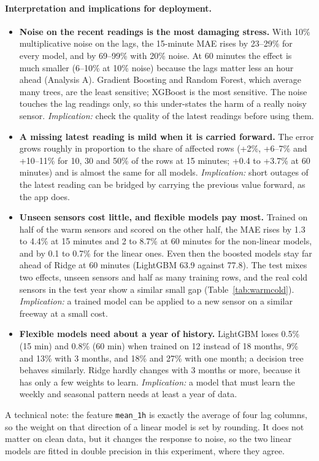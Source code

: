 \documentclass[11pt,a4paper]{article}
\newcommand{\code}[1]{\texttt{#1}}
\begin{document}
\paragraph{Interpretation and implications for deployment.}
\begin{itemize}
\item \textbf{Noise on the recent readings is the most damaging stress.} With 10\% multiplicative noise on the lags, the 15-minute MAE rises by 23--29\% for every model, and by 69--99\% with 20\% noise. At 60 minutes the effect is much smaller (6--10\% at 10\% noise) because the lags matter less
an hour ahead (Analysis A). Gradient Boosting and Random Forest, which average many trees, are the least sensitive; XGBoost is the most sensitive. The noise touches the lag readings only, so this under-states the harm of a really noisy sensor. \emph{Implication:} check the quality of the latest readings before using them.
\item \textbf{A missing latest reading is mild when it is carried forward.} The error grows roughly in proportion to the share of affected rows (+2\%, +6--7\% and +10--11\% for 10, 30 and 50\% of the rows at 15 minutes; +0.4 to +3.7\% at 60 minutes) and is almost the same for all models.
\emph{Implication:} short outages of the latest reading can be bridged by carrying the previous value forward, as the app does.
\item \textbf{Unseen sensors cost little, and flexible models pay most.} Trained on half of the warm sensors and scored on the other half, the MAE rises by 1.3 to 4.4\% at 15 minutes and 2 to 8.7\% at 60 minutes for the non-linear models, and by 0.1 to 0.7\% for the linear ones. Even then the boosted models stay far ahead of Ridge at 60 minutes
(LightGBM 63.9 against 77.8). The test mixes two effects, unseen sensors and half as many training rows, and the real cold sensors in the test year show a similar small gap (Table~\ref{tab:warmcold}). \emph{Implication:} a trained model can be applied to a new sensor on a similar freeway at a small cost.
\item \textbf{Flexible models need about a year of history.} LightGBM loses 0.5\% (15 min) and 0.8\% (60 min) when trained on 12 instead of 18 months, 9\% and 13\% with 3 months, and 18\% and 27\% with one month; a decision tree behaves similarly. Ridge hardly changes with 3 months or more, because it has only a few weights to learn.
\emph{Implication:} a model that must learn the weekly and seasonal pattern needs at least a year of data.
\end{itemize}
A technical note: the feature \code{mean\_1h} is exactly the average of four lag columns, so the weight on that direction of a linear model is set by rounding. It does not matter on clean data, but it changes the response to noise, so the two linear models are fitted in double precision in this experiment, where they agree.
\end{document}

